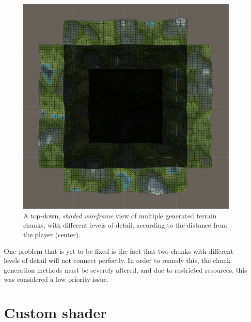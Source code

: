 \begin{figure}[htp]
    \centering
    \includegraphics[width = 12cm]{figures/terraChunkLOD.png}
    \caption{A top-down, \textit{shaded wireframe} view of multiple generated terrain chunks, with different levels of detail, according to the distance from the player (center).}
    \label{fig:terraChunkLOD}
\end{figure}

One problem that is yet to be fixed is the fact that two chunks with different levels of detail will not connect perfectly. In order to remedy this, the chunk generation methods must be severely altered, and due to restricted resources, this was considered a low priority issue.

\section{Custom shader}

